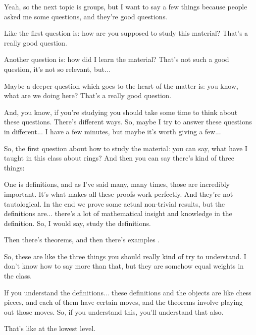 \begin{speech}[00:40:39 - 00:41:34]
Yeah, so the next topic is groups, but I want to say a few things because people asked me some questions, and they're good questions.

Like the first question is: how are you supposed to study this material? That's a really good question.

Another question is: how did I learn the material? That's not such a good question, it's not so relevant, but...

Maybe a deeper question which goes to the heart of the matter is: you know, what are we doing here? That's a really good question.

And, you know, if you're studying you should take some time to think about these questions. There's different ways. So, maybe I try to answer these questions in different... I have a few minutes, but maybe it's worth giving a few...

So, the first question about how to study the material: you can say, what have I taught in this class about rings? And then you can say there's kind of three things:

One is definitions, and as I've said many, many times, those are incredibly important. It's what makes all these proofs work perfectly. And they're not tautological. In the end we prove some actual non-trivial results, but the definitions are... there's a lot of mathematical insight and knowledge in the definition. So, I would say, study the definitions.

Then there's theorems, and then there's examples .

So, these are like the three things you should really kind of try to understand. I don't know how to say more than that, but they are somehow equal weights in the class.

If you understand the definitions... these definitions and the objects are like chess pieces, and each of them have certain moves, and the theorems involve playing out those moves. So, if you understand this, you'll understand that also.

That's like at the lowest level.
\end{speech}

